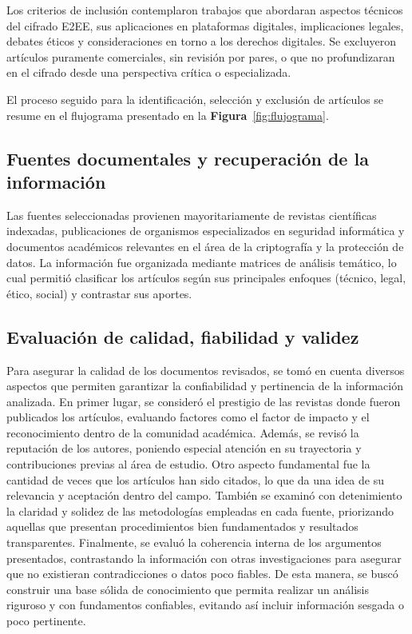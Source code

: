 \documentclass[spanish,12pt,a4paper]{article}
\begin{document}
\begin{multicols}{2}
		Los criterios de inclusión contemplaron trabajos que abordaran aspectos técnicos del cifrado E2EE, sus aplicaciones en plataformas digitales, implicaciones legales, debates éticos y consideraciones en torno a los derechos digitales. Se excluyeron artículos puramente comerciales, sin revisión por pares, o que no profundizaran en el cifrado desde una perspectiva crítica o especializada.
		
		El proceso seguido para la identificación, selección y exclusión de artículos se resume en el flujograma presentado en la \textbf{Figura}~\ref{fig:flujograma}.
		
		
		
		\subsection*{\normalsize Fuentes documentales y recuperación de la información }
		Las fuentes seleccionadas provienen mayoritariamente de revistas científicas indexadas, publicaciones de organismos especializados en seguridad informática y documentos académicos relevantes en el área de la criptografía y la protección de datos. La información fue organizada mediante matrices de análisis temático, lo cual permitió clasificar los artículos según sus principales enfoques (técnico, legal, ético, social) y contrastar sus aportes.
		\subsection*{\normalsize Evaluación de calidad, fiabilidad y validez }
		Para asegurar la calidad de los documentos revisados, se tomó en cuenta diversos aspectos que permiten garantizar la confiabilidad y pertinencia de la información analizada. En primer lugar, se consideró el prestigio de las revistas donde fueron publicados los artículos, evaluando factores como el factor de impacto y el reconocimiento dentro de la comunidad académica. Además, se revisó la reputación de los autores, poniendo especial atención en su trayectoria y contribuciones previas al área de estudio. Otro aspecto fundamental fue la cantidad de veces que los artículos han sido citados, lo que da una idea de su relevancia y aceptación dentro del campo. También se examinó con detenimiento la claridad y solidez de las metodologías empleadas en cada fuente, priorizando aquellas que presentan procedimientos bien fundamentados y resultados transparentes. Finalmente, se evaluó la coherencia interna de los argumentos presentados, contrastando la información con otras investigaciones para asegurar que no existieran contradicciones o datos poco fiables. De esta manera, se buscó construir una base sólida de conocimiento que permita realizar un análisis riguroso y con fundamentos confiables, evitando así incluir información sesgada o poco pertinente.
		
	\end{multicols}
	
\end{document}
